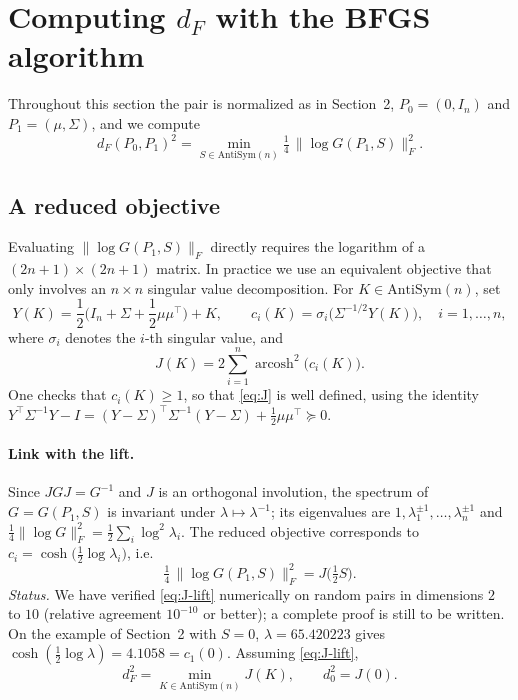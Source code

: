 
\section{Computing $d_F$ with the BFGS algorithm}

Throughout this section the pair is normalized as in Section~2, $P_0=(0,I_n)$ and $P_1=(\mu,\Sigma)$,
and we compute
\[
d_F(P_0,P_1)^2=\min_{S\in\mathrm{AntiSym}(n)}\tfrac14\,\|\log G(P_1,S)\|_F^2 .
\]

\subsection{A reduced objective}

Evaluating $\|\log G(P_1,S)\|_F$ directly requires the logarithm of a $(2n+1)\times(2n+1)$ matrix.
In practice we use an equivalent objective that only involves an $n\times n$ singular value decomposition.
For $K\in\mathrm{AntiSym}(n)$, set
\[
Y(K)=\frac12\Big(I_n+\Sigma+\frac12\mu\mu^\top\Big)+K,
\qquad
c_i(K)=\sigma_i\big(\Sigma^{-1/2}Y(K)\big),\quad i=1,\dots,n,
\]
where $\sigma_i$ denotes the $i$-th singular value, and
\begin{equation}
J(K)=2\sum_{i=1}^n \operatorname{arcosh}^2\big(c_i(K)\big).
\label{eq:J}
\end{equation}
One checks that $c_i(K)\ge 1$, so that \eqref{eq:J} is well defined, using the identity
$Y^\top\Sigma^{-1}Y-I=(Y-\Sigma)^\top\Sigma^{-1}(Y-\Sigma)+\frac12\mu\mu^\top\succeq0$.

\paragraph{Link with the lift.}
Since $JGJ=G^{-1}$ and $J$ is an orthogonal involution, the spectrum of $G=G(P_1,S)$ is invariant under
$\lambda\mapsto\lambda^{-1}$; its eigenvalues are $1,\lambda_1^{\pm1},\dots,\lambda_n^{\pm1}$ and
$\tfrac14\|\log G\|_F^2=\tfrac12\sum_i\log^2\lambda_i$.
The reduced objective corresponds to $c_i=\cosh\big(\tfrac12\log\lambda_i\big)$, i.e.
\begin{equation}
\tfrac14\,\|\log G(P_1,S)\|_F^2 = J\big(\tfrac12 S\big).
\label{eq:J-lift}
\end{equation}
\emph{Status.} We have verified \eqref{eq:J-lift} numerically on random pairs in dimensions $2$ to $10$
(relative agreement $10^{-10}$ or better); a complete proof is still to be written.
On the example of Section~2 with $S=0$, $\lambda=65.420223$ gives
$\cosh(\tfrac12\log\lambda)=4.1058=c_1(0)$.
Assuming \eqref{eq:J-lift},
\[
d_F^2=\min_{K\in\mathrm{AntiSym}(n)}J(K),\qquad d_0^2=J(0).
\]

